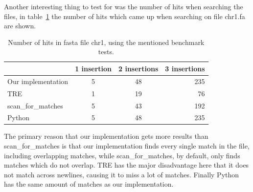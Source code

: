 Another interesting thing to test for was the number of hits when searching the files, in table~\ref{tab:hits} the number of hits which came up when searching on file chr1.fa are shown.

\begin{table}[h!]
\centering
\begin{tabular}{ l | c c r }
& 1 insertion & 2 insertions & 3 insertions\\
\hline
Our implementation& 5 &  48 & 235 \\
TRE& 1 & 19 & 76 \\
scan\_for\_matches & 5 & 43  & 192 \\
Python & 5 & 48 & 235
\end{tabular}
\caption{Number of hits in fasta file chr1, using the mentioned benchmark tests.}
\label{tab:hits}
\end{table}

The primary reason that our implementation gets more results than scan\_for\_matches is that our implementation finds every single match in the file, including overlapping matches, while scan\_for\_matches, by default, only finds matches which do not overlap. TRE has the major disadvantage here that it does not match across newlines, causing it to miss a lot of matches. Finally Python has the same amount of matches as our implementation.